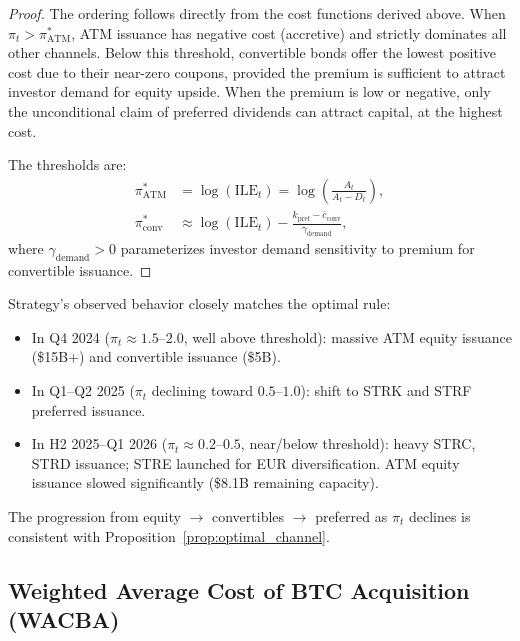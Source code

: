 \begin{proof}
The ordering follows directly from the cost functions derived above.
When $\pi_t > \pi^*_{\mathrm{ATM}}$, ATM issuance has negative cost
(accretive) and strictly dominates all other channels.
Below this threshold, convertible bonds offer the lowest positive cost
due to their near-zero coupons, provided the premium is sufficient
to attract investor demand for equity upside.
When the premium is low or negative, only the unconditional claim
of preferred dividends can attract capital, at the highest cost.

The thresholds are:
\begin{align}
  \pi^*_{\mathrm{ATM}} &= \log(\mathrm{ILE}_t)
  = \log\!\left(\frac{A_t}{A_t - D_t}\right), \\
  \pi^*_{\mathrm{conv}} &\approx \log(\mathrm{ILE}_t)
  - \frac{k_{\mathrm{pref}} - \bar{c}_{\mathrm{conv}}}
         {\gamma_{\mathrm{demand}}},
\end{align}
where $\gamma_{\mathrm{demand}} > 0$ parameterizes investor demand
sensitivity to premium for convertible issuance.
\end{proof}

\begin{remark}
Strategy's observed behavior closely matches the optimal rule:
\begin{itemize}
  \item In Q4 2024 ($\pi_t \approx 1.5$--$2.0$, well above threshold):
    massive ATM equity issuance (\$15B+) and convertible issuance (\$5B).
  \item In Q1--Q2 2025 ($\pi_t$ declining toward $0.5$--$1.0$):
    shift to STRK and STRF preferred issuance.
  \item In H2 2025--Q1 2026 ($\pi_t \approx 0.2$--$0.5$, near/below threshold):
    heavy STRC, STRD issuance; STRE launched for EUR diversification.
    ATM equity issuance slowed significantly (\$8.1B remaining capacity).
\end{itemize}
The progression from equity $\to$ convertibles $\to$ preferred
as $\pi_t$ declines is consistent with Proposition~\ref{prop:optimal_channel}.
\end{remark}

\subsection{Weighted Average Cost of BTC Acquisition (WACBA)}

